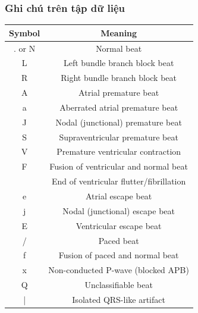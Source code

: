 \subsubsection{Ghi chú trên tập dữ liệu}
\begin{center}
    \begin{tabular}{|c|c|}
         \hline
         Symbol & Meaning \\
         \hline
         . or N & Normal beat \\
         \hline
         L & Left bundle branch block beat \\
         \hline
         R & Right bundle branch block beat \\
         \hline
         A & Atrial premature beat \\
         \hline
         a & Aberrated atrial premature beat \\
         \hline
         J & Nodal (junctional) premature beat\\
         S & Supraventricular premature beat\\
         \hline
         V & Premature ventricular contraction\\
         \hline
         F & Fusion of ventricular and normal beat\\
         \hline
         [ & Start of ventricular flutter/fibrillation\\
         \hline
         ! & Ventricular flutter wave\\
         \hline
         ] & End of ventricular flutter/fibrillation\\
         \hline
         e & Atrial escape beat\\
         \hline
         j & Nodal (junctional) escape beat\\
         \hline
         E & Ventricular escape beat\\
         \hline
         / & Paced beat\\
         \hline
         f & Fusion of paced and normal beat\\
         \hline
         x & Non-conducted P-wave (blocked APB)\\
         \hline
         Q & Unclassifiable beat\\
         \hline
         | & Isolated QRS-like artifact\\
         \hline
    \end{tabular}
\end{center}

